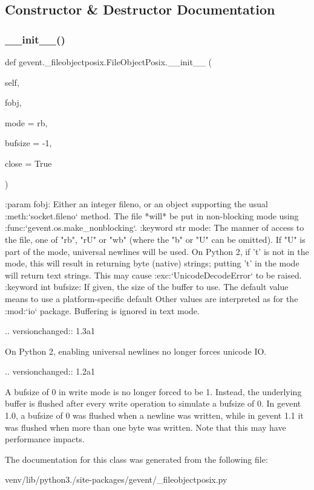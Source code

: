 \subsection{Constructor \& Destructor Documentation}
\mbox{\label{classgevent_1_1__fileobjectposix_1_1_file_object_posix_a349d8eb16287677be25306052b1efae9}} 
\subsubsection{\texorpdfstring{\+\_\+\+\_\+init\+\_\+\+\_\+()}{\_\_init\_\_()}}
{\footnotesize\ttfamily def gevent.\+\_\+fileobjectposix.\+File\+Object\+Posix.\+\_\+\+\_\+init\+\_\+\+\_\+ (\begin{DoxyParamCaption}\item[{}]{self,  }\item[{}]{fobj,  }\item[{}]{mode = {\ttfamily \textquotesingle{}rb\textquotesingle{}},  }\item[{}]{bufsize = {\ttfamily -\/1},  }\item[{}]{close = {\ttfamily True} }\end{DoxyParamCaption})}

\begin{DoxyVerb}:param fobj: Either an integer fileno, or an object supporting the
    usual :meth:`socket.fileno` method. The file *will* be
    put in non-blocking mode using :func:`gevent.os.make_nonblocking`.
:keyword str mode: The manner of access to the file, one of "rb", "rU" or "wb"
    (where the "b" or "U" can be omitted).
    If "U" is part of the mode, universal newlines will be used. On Python 2,
    if 't' is not in the mode, this will result in returning byte (native) strings;
    putting 't'  in the mode will return text strings. This may cause
    :exc:`UnicodeDecodeError` to be raised.
:keyword int bufsize: If given, the size of the buffer to use. The default
    value means to use a platform-specific default
    Other values are interpreted as for the :mod:`io` package.
    Buffering is ignored in text mode.

.. versionchanged:: 1.3a1

   On Python 2, enabling universal newlines no longer forces unicode
   IO.

.. versionchanged:: 1.2a1

   A bufsize of 0 in write mode is no longer forced to be 1.
   Instead, the underlying buffer is flushed after every write
   operation to simulate a bufsize of 0. In gevent 1.0, a
   bufsize of 0 was flushed when a newline was written, while
   in gevent 1.1 it was flushed when more than one byte was
   written. Note that this may have performance impacts.
\end{DoxyVerb}
 

The documentation for this class was generated from the following file\+:\begin{DoxyCompactItemize}
\item 
venv/lib/python3./site-\/packages/gevent/\+\_\+fileobjectposix.\+py\end{DoxyCompactItemize}
